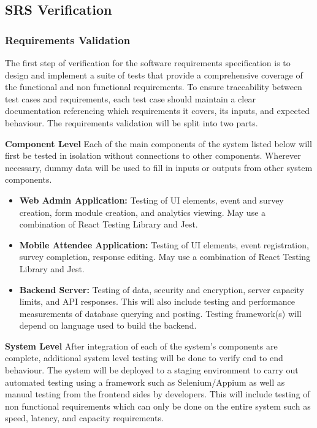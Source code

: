 \documentclass[12pt, titlepage]{article}
\begin{document}
\subsection{SRS Verification}

\subsubsection{Requirements Validation}
The first step of verification for the software requirements specification is to design and implement a suite of tests that provide a comprehensive coverage of the functional and non functional requirements. To ensure traceability between test cases and requirements, each test case should maintain a clear documentation referencing which requirements it covers, its inputs, and expected behaviour. The requirements validation will be split into two parts.

\textbf{Component Level}
Each of the main components of the system listed below will first be tested in isolation without connections to other components. Wherever necessary, dummy data will be used to fill in inputs or outputs from other system components.
\begin{itemize}
  \item \textbf{Web Admin Application:} Testing of UI elements, event and survey creation, form module creation, and analytics viewing. May use a combination of React Testing Library and Jest.
  \item \textbf{Mobile Attendee Application:} Testing of UI elements, event registration, survey completion, response editing. May use a combination of React Testing Library and Jest.
  \item \textbf{Backend Server:} Testing of data, security and encryption, server capacity limits, and API responses. This will also include testing and performance measurements of database querying and posting. Testing framework(s) will depend on language used to build the backend.
\end{itemize}

\textbf{System Level}
  After integration of each of the system's components are complete, additional system level testing will be done to verify end to end behaviour. The system will be deployed to a staging environment to carry out automated testing using a framework such as Selenium/Appium as well as manual testing from the frontend sides by developers. This will include testing of non functional requirements which can only be done on the entire system such as speed, latency, and capacity requirements.
\end{document}
